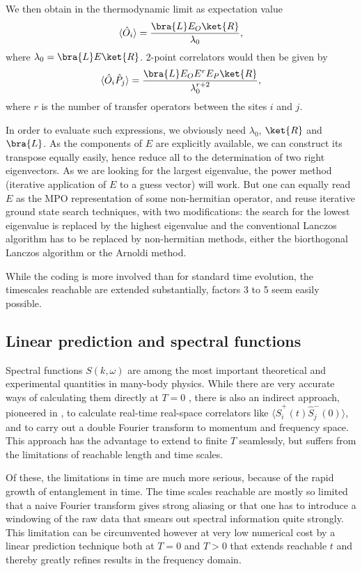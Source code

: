 We then obtain in the thermodynamic limit as expectation value
\begin{equation}
\langle \hat{O}_i \rangle =  \frac{\bra{L} E_O \ket{R}}{\lambda_0} ,
\end{equation}
where $\lambda_0 = \bra{L} E \ket{R}$. 2-point correlators would then be given by
\begin{equation}
\langle \hat{O}_i \hat{P}_j \rangle =  \frac{\bra{L} E_O E^r E_P \ket{R}}{\lambda_0^{r+2}},
\end{equation}
where $r$ is the number of transfer operators between the sites $i$ and $j$. 

In order to evaluate such expressions, we obviously need $\lambda_0$, $\ket{R}$ and $\bra{L}$. As the components of $E$ are explicitly available, we can construct its transpose equally easily, hence reduce all to the determination of two right eigenvectors. As we are looking for the largest eigenvalue, the power method (iterative application of $E$ to a guess vector) will work. But one can equally read $E$ as the MPO representation of some non-hermitian operator, and reuse iterative ground state search techniques, with two modifications: the search for the lowest eigenvalue is replaced by the highest eigenvalue and the conventional Lanczos algorithm has to be replaced by non-hermitian methods, either the biorthogonal Lanczos algorithm or the Arnoldi method. 

While the coding is more involved than for standard time evolution, the timescales reachable are extended substantially, factors 3 to 5 seem easily possible.
  
\subsection{Linear prediction and spectral functions}
Spectral functions $S(k,\omega)$ are among the most important theoretical and experimental quantities in many-body physics. While there are very accurate ways of calculating them directly at $T=0$ \cite{Hallberg95,Ramasesha97,Kuhner99,Jeckelmann02}, there is also an indirect approach, pioneered in \cite{WhiteFeiguin04}, to calculate real-time real-space correlators like $\langle \hat{S}^+_i(t) \hat{S}^-_j(0) \rangle$, and to carry out a double Fourier transform to momentum and frequency space. This approach has the advantage to extend to finite $T$ seamlessly, but suffers from the limitations of reachable length and time scales.

Of these, the limitations in time are much more serious, because of the rapid growth of entanglement in time. The time scales reachable are mostly so limited that a naive Fourier transform gives strong aliasing or that one has to introduce a windowing of the raw data that smears out spectral information quite strongly.  This limitation can be circumvented however at very low numerical cost by a linear prediction technique both at $T=0$\cite{Pereira08,White08} and $T>0$\cite{Barthel09b} that extends reachable $t$ and thereby greatly refines results in the frequency domain.

